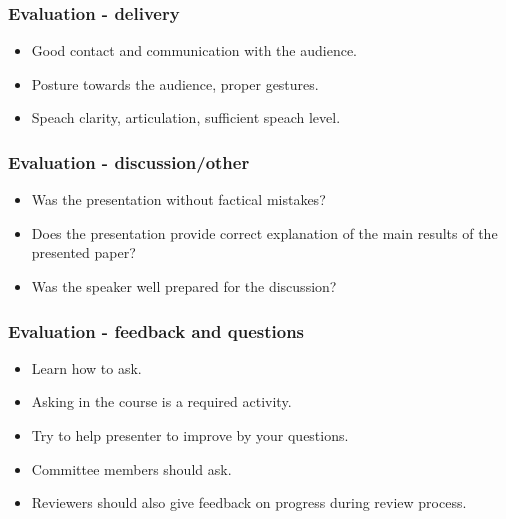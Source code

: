 \begin{frame}
\frametitle{Evaluation - delivery}
\begin{itemize}
      \item{Good contact and communication with the audience.}
      \item{Posture towards the audience, proper gestures.}
      \item{Speach clarity, articulation, sufficient speach level.}
\end{itemize}
\end{frame}

\begin{frame}
\frametitle{Evaluation - discussion/other}
\begin{itemize}
      \item{Was the presentation without factical mistakes?}
      \item{Does the presentation provide correct explanation of the main results of the presented paper?}
      \item{Was the speaker well prepared for the discussion?}
\end{itemize}
\end{frame}


\begin{frame}
\frametitle{Evaluation - feedback and questions}
\begin{itemize}
\item Learn how to ask.
\item Asking in the course is a required activity.
\item Try to help presenter to improve by your questions.
\item Committee members should ask.
\item Reviewers should also give feedback on progress during review process.
\end{itemize}
\end{frame}
